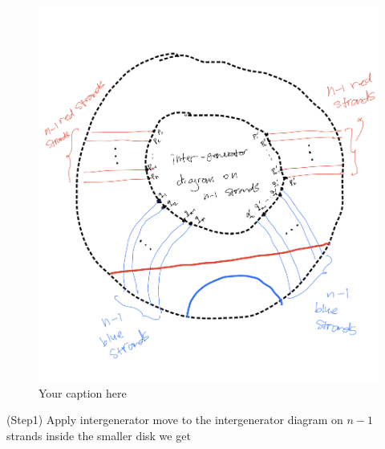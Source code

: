 \begin{figure}[H] %
    \centering
    \includegraphics[width=\linewidth]{diagrams/definition14-2/2.png} %
    \caption{Your caption here}
    \label{fig:your-label}
\end{figure}

(Step1) Apply intergenerator move to the intergenerator diagram on $n-1$ strands inside the smaller disk we get

